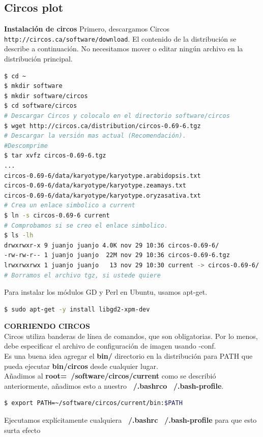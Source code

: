 \documentclass[12pt,letterpaper]{article}
\begin{document}
\subsection{Circos plot}
\textbf{Instalación de circos}
Primero, descargamos Circos \texttt{http://circos.ca/software/download}. El contenido de la distribución se describe a continuación.
No necesitamos mover o editar ningún archivo en la distribución principal.
\begin{lstlisting}[language=bash,caption={Suponiendo que desea instalar en ROOT=~/software/circos},style=consola]
$ cd ~
$ mkdir software
$ mkdir software/circos
$ cd software/circos
# Descargar Circos y colocalo en el directorio software/circos
$ wget http://circos.ca/distribution/circos-0.69-6.tgz
# Descargar la versión mas actual (Recomendación).
#Descomprime 
$ tar xvfz circos-0.69-6.tgz
...
circos-0.69-6/data/karyotype/karyotype.arabidopsis.txt
circos-0.69-6/data/karyotype/karyotype.zeamays.txt
circos-0.69-6/data/karyotype/karyotype.oryzasativa.txt
# Crea un enlace simbolico a current 
$ ln -s circos-0.69-6 current
# Comprobamos si se creo el enlace simbolico.
$ ls -lh
drwxrwxr-x 9 juanjo juanjo 4.0K nov 29 10:36 circos-0.69-6/
-rw-rw-r-- 1 juanjo juanjo  22M nov 29 10:36 circos-0.69-6.tgz
lrwxrwxrwx 1 juanjo juanjo   13 nov 29 10:30 current -> circos-0.69-6/
# Borramos el archivo tgz, si ustede quiere
\end{lstlisting}
Para instalar los módulos GD y Perl en Ubuntu, usamos apt-get.\\
\begin{lstlisting}[language=bash, style=consola]
$ sudo apt-get -y install libgd2-xpm-dev
\end{lstlisting}
\textbf{CORRIENDO CIRCOS}\\ 
Circos utiliza banderas de línea de comandos, que son obligatorias. Por lo menos, debe especificar el archivo de configuración de imagen usando -conf.\\
Es una buena idea agregar el \textbf{bin/} directorio en la distribución para PATH que pueda ejecutar \textbf{bin/circos} desde cualquier lugar.\\
Añadimos al \textbf{root=~/software/circos/current} como se describió anteriormente, añadimos esto a nuestro \textbf{~/.bashrco} \textbf{~/.bash-profile}.\\ 
\begin{lstlisting}[language=bash, style=consola]
$ export PATH=~/software/circos/current/bin:$PATH
\end{lstlisting}
Ejecutamos explícitamente cualquiera \textbf{~/.bashrc} \textbf{~/.bash-profile} para que esto surta efecto\\
\end{document}
